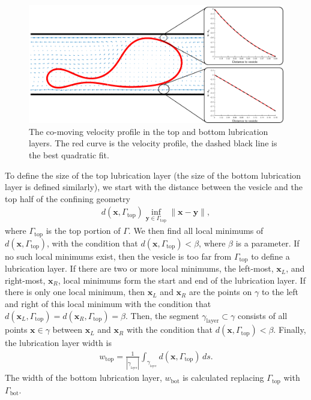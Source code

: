 \documentclass[twoside,twocolumn,9pt]{article}
\newcommand{\xx}{\mathbf{x}}
\newcommand{\yy}{\mathbf{y}}
\begin{document}
\begin{figure}[H]
    \centering
    \includegraphics[width=\columnwidth]{figures/lubricationLayer_quadratic.pdf}  
    \caption{The co-moving velocity profile in the top and bottom lubrication layers. The red curve is the velocity profile, the dashed black line is the best quadratic fit.}
    \label{fig:quadraticProof}
\end{figure}

To define the size of the top lubrication layer (the size of the bottom lubrication layer is defined similarly), we start with the distance between the vesicle and the top half of the confining geometry
\begin{align}
    d(\xx,\Gamma_\mathrm{top}) \inf_{\yy \in \Gamma_\mathrm{top}} \|\xx-\yy\|,
\end{align}
where $\Gamma_{\mathrm{top}}$ is the top portion of $\Gamma$. We then find all local minimums of $d(\xx,\Gamma_\mathrm{top})$, with the condition that $d(\xx,\Gamma_\mathrm{top}) < \beta$, where $\beta$ is a parameter. If no such local minimums exist, then the vesicle is too far from $\Gamma_\mathrm{top}$ to define a lubrication layer. If there are two or more local minimums, the left-most, $\xx_L$, and right-most, $\xx_R$, local minimums form the start and end of the lubrication layer. If there is only one local minimum, then $\xx_L$ and $\xx_R$ are the points on $\gamma$ to the left and right of this local minimum with the condition that $d(\xx_L,\Gamma_\mathrm{top}) = d(\xx_R,\Gamma_\mathrm{top}) = \beta$. Then, the segment $\gamma_{\mathrm{layer}} \subset \gamma$ consists of all points $\xx \in \gamma$ between $\xx_L$ and $\xx_R$ with the condition that $d(\xx,\Gamma_\mathrm{top}) < \beta$. Finally, the lubrication layer width is
\begin{align}
    w_\mathrm{top} = \frac{1}{|\gamma_{_\mathrm{layer}}|} \int_{\gamma_{_\mathrm{layer}}} d(\xx,\Gamma_\mathrm{top}) \, ds.
\end{align}
The width of the bottom lubrication layer, $w_\mathrm{bot}$ is calculated replacing $\Gamma_\mathrm{top}$ with $\Gamma_\mathrm{bot}$. 
\end{document}
